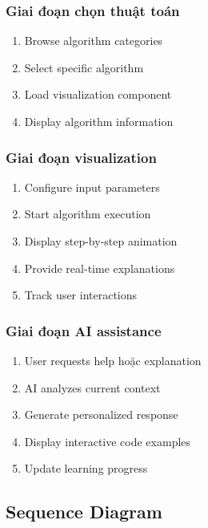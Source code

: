 \documentclass[12pt,a4paper]{article}
\begin{document}
\subsubsection{Giai đoạn chọn thuật toán}
\begin{enumerate}
    \item Browse algorithm categories
    \item Select specific algorithm
    \item Load visualization component
    \item Display algorithm information
\end{enumerate}

\subsubsection{Giai đoạn visualization}
\begin{enumerate}
    \item Configure input parameters
    \item Start algorithm execution
    \item Display step-by-step animation
    \item Provide real-time explanations
    \item Track user interactions
\end{enumerate}

\subsubsection{Giai đoạn AI assistance}
\begin{enumerate}
    \item User requests help hoặc explanation
    \item AI analyzes current context
    \item Generate personalized response
    \item Display interactive code examples
    \item Update learning progress
\end{enumerate}

\subsection{Sequence Diagram}
\end{document}
